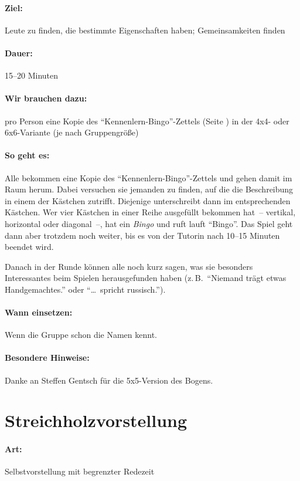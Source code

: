 \paragraph{Ziel:} Leute zu finden, die bestimmte Eigenschaften haben; Gemeinsamkeiten finden
\paragraph{Dauer:} 15--20 Minuten
\paragraph{Wir brauchen dazu:} pro Person eine Kopie des "`Kennenlern-Bingo"'-Zettels (Seite \pageref{bingo}) in der 4x4- oder 6x6-Variante (je nach Gruppengröße)
\paragraph{So geht es:} Alle bekommen eine Kopie des "`Kennenlern-Bingo"'-Zettels und gehen damit im Raum herum. Dabei versuchen sie jemanden zu finden, auf die die Beschreibung in einem der Kästchen zutrifft. Diejenige unterschreibt dann im entsprechenden Kästchen. Wer vier Kästchen in einer Reihe ausgefüllt bekommen hat~-- vertikal, horizontal oder diagonal~--, hat ein \emph{Bingo} und ruft lauft "`Bingo"'. Das Spiel geht dann aber trotzdem noch weiter, bis es von der Tutorin nach 10--15 Minuten beendet wird.

Danach in der Runde können alle noch kurz sagen, was sie besonders Interessantes beim Spielen herausgefunden haben (z.\,B.~"`Niemand trägt etwas Handgemachtes."' oder "`\ldots\ spricht russisch."').
\paragraph{Wann einsetzen:} Wenn die Gruppe schon die Namen kennt.
\paragraph{Besondere Hinweise:} Danke an Steffen Gentsch für die 5x5-Version des Bogens.

\section{Streichholzvorstellung}
\paragraph{Art:} Selbstvorstellung mit begrenzter Redezeit

